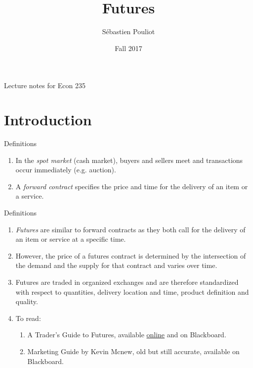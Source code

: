 \documentclass[table,xcolor=pdftex,dvipsnames]{beamer}\usepackage[]{graphicx}\usepackage[]{color}
\title[Futures]{Futures}
\author[Pouliot]{S\'{e}bastien Pouliot}
\institute{Iowa State University}
\date{Fall 2017}
\begin{document}

\begin{frame}
\titlepage
\vspace{-0.4in}
\begin{center}
Lecture notes for Econ 235\\
\end{center}
\end{frame}

\section{Introduction}

\begin{frame}{Definitions}
\begin{enumerate}[label=\textbullet]
  \item In the \emph{spot market} (cash market), buyers and sellers meet and transactions occur immediately (e.g. auction).
  \item A \emph{forward contract} specifies the price and time for the delivery of an item or a service.
\end{enumerate}
\end{frame}


\begin{frame}{Definitions}
\begin{enumerate}[label=\textbullet]
  \item \emph{Futures} are similar to forward contracts as they both call for the delivery of an item or service at a specific time.
  \item However, the price of a futures contract is determined by the intersection of the demand and the supply for that contract and varies over time.
  \item Futures are traded in organized exchanges and are therefore standardized with respect to quantities, delivery location and time, product definition and quality.
  \item To read:
      \begin{enumerate}[label=\roman{*})]
          \item A Trader's Guide to Futures, available \href{http://www.cmegroup.com/education/a-traders-guide-to-futures.html}{online} and on Blackboard.
          \item Marketing Guide by Kevin Mcnew, old but still accurate, available on Blackboard.
      \end{enumerate}
\end{enumerate}
\end{frame}
\end{document}
